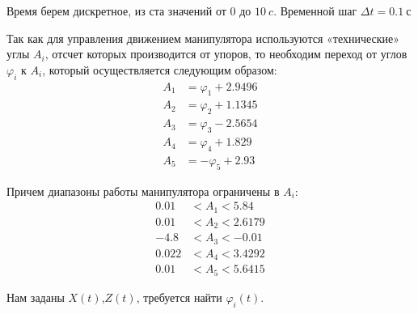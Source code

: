 Время берем дискретное, из ста значений от $0$ до $10 \: c$. Временной шаг $ \Delta t = 0.1 \: с $

Так как для управления движением манипулятора используются «технические» углы $A_i$, отсчет которых производится от упоров, то необходим переход от углов $\varphi_i$ к $A_i$, который осуществляется следующим образом:
\begin{align*}
    A_1 &= \varphi_1+2.9496 \\
    A_2 &= \varphi_2+1.1345 \\
    A_3 &= \varphi_3-2.5654 \\
    A_4 &= \varphi_4+1.829 \\
    A_5 &= -\varphi_5+2.93 
\end{align*}

Причем диапазоны работы манипулятора ограничены в $A_i$:
\begin{align*}
   0.01 &< A_1 < 5.84 \\
   0.01 &< A_2 < 2.6179 \\
   -4.8 &< A_3 < -0.01 \\
   0.022 &< A_4 < 3.4292 \\
   0.01 &< A_5 < 5.6415 
\end{align*}

Нам заданы $X(t)$,$Z(t)$, требуется найти $\varphi_i (t)$.